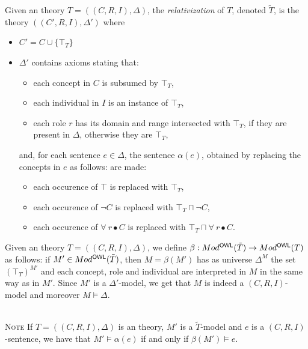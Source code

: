 \documentclass[10pt, a4paper]{isov2}
\renewenvironment{note}[0]{\ \\ \textsc{Note} \quad}{}
\begin{document}


\begin{definition}
Given an \OWL theory $T = ((C,R,I), \Delta)$,
the \emph{relativization} of $T$, denoted $\tilde{T}$, is the theory 
$((C',R,I),\Delta')$ where
\begin{itemize}
\item $C' = C\cup\{\top_T\}$
\item $\Delta'$ contains axioms stating that:
  \begin{itemize}
    \item each concept in $C$ is subsumed by $\top_T$,
    \item each individual in $I$ is an instance of $\top_T$,
    \item each role $r$ has its domain and range intersected with $\top_T$, if they
    are present in $\Delta$, otherwise they are $\top_T$,
  \end{itemize}
  \noindent and, for each sentence $e\in\Delta$, the sentence $\alpha(e)$, obtained by
  replacing the concepts in $e$ as follows:
  are made:
  \begin{itemize}
   \item each occurence of $\top$ is replaced with $\top_T$,
   \item each occurence of $\neg C$ is replaced with $\top_T \sqcap \neg C$,
   \item each occurence of $\forall~r\bullet C$ is replaced with 
   $\top_T \sqcap \forall~r\bullet C$.
  \end{itemize}
\end{itemize}
\end{definition}

\begin{definition}
Given an \OWL theory $T = ((C,R,I), \Delta)$,
we define $\beta: Mod^\mathsf{OWL}(\tilde{T}) \to Mod^\mathsf{OWL}(T)$ as follows: 
if $M'\in Mod^\mathsf{OWL}(\tilde{T})$, then $M=\beta(M')$ has as universe
$\Delta^M$ the set $(\top_T)^{M'}$ and each concept, role and individual are
interpreted in $M$ in the same way as in $M'$. Since $M'$ is a $\Delta'$-model,
we get that $M$ is indeed a $(C,R,I)$-model and moreover $M\models \Delta$.
\end{definition}

\begin{note}
If $T = ((C,R,I),\Delta)$ is an \OWL theory, $M'$ is a $\tilde{T}$-model and
$e$ is a $(C,R,I)$-sentence, we have that $M'\models \alpha(e)$ if and only if
$\beta(M')\models e$.
\end{note}
\end{document}
